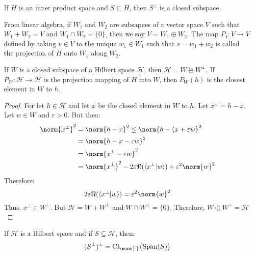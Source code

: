     \begin{theorem}
        If $H$ is an inner product space and
        $S\subseteq{H}$, then $S^{\perp}$ is a closed
        subspace.
    \end{theorem}
    From linear algebra, if $W_{1}$ and $W_{2}$ are
    subsapces of a vector space $V$ such that
    $W_{1}+W_{2}=V$ and $W_{1}\cap{W}_{2}=\{0\}$, then
    we say $V=W_{1}\oplus{W}_{2}$. The map
    $P_{1}:V\rightarrow{V}$ defined by taking $v\in{V}$ to
    the unique $w_{1}\in{W}_{1}$ such that
    $v=w_{1}+w_{2}$ is called the projection of $H$
    onto $W_{1}$ along $W_{2}$.
    \begin{theorem}
        If $W$ is a closed subspace of a Hilbert space
        $\mathcal{H}$, then
        $\mathcal{H}=W\oplus{W}^{\perp}$. If
        $P_{W}:\mathcal{H}\rightarrow\mathcal{H}$ is the
        projection mapping of $H$ into $W$, then
        $P_{W}(h)$ is the closest element in $W$ to $h$.
    \end{theorem}
    \begin{proof}
        For let $h\in\mathcal{H}$ and let $x$ be the
        closed element in $W$ to $h$. Let
        $x^{\perp}=h-x$. Let $w\in{W}$ and
        $\varepsilon>0$. But then:
        \begin{subequations}
            \begin{align}
                \norm{x^{\perp}}^{2}
                &=\norm{h-x}^{2}\leq
                \norm{h-(x+\varepsilon{w}}^{2}\\
                &=\norm{h-x-\varepsilon{w}}^{2}\\
                &=\norm{x^{\perp}-\varepsilon{w}}^{2}\\
                &=\norm{x^{\perp}}^{2}-
                2\varepsilon\Re(\langle{x^{\perp}|w}\rangle)
                +\varepsilon^{2}\norm{w}^{2}
            \end{align}
        \end{subequations}
        Therefore:
        \begin{equation}
            2\varepsilon\Re(\langle{x^{\perp}|w}\rangle)
            =\varepsilon^{2}\norm{w}^{2}
        \end{equation}
        Thus, $x^{\perp}\in{W}^{\perp}$. But
        $\mathcal{H}=W+W^{\perp}$ and
        $W\cap{W}^{\perp}=\{0\}$.
        Therefore, $W\oplus{W}^{+}=\mathcal{H}$
    \end{proof}
    \begin{theorem}
        If $\mathcal{H}$ is a Hilbert space and if
        $S\subseteq\mathcal{H}$, then:
        \begin{equation}
            (S^{\perp})^{\perp}
            =\mathrm{Cl}_{\norm{\cdot}}\big(\mathrm{Span}(S)\big)
        \end{equation}
    \end{theorem}
